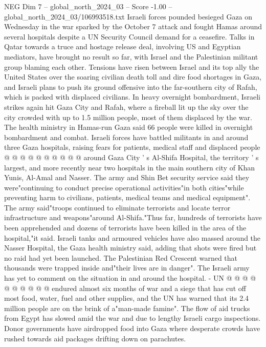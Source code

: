 \begin{textsample}{NEG Dim 7 – global\_north\_2024\_03 – Score -1.00 – global\_north\_2024\_03/106993518.txt}  \label{ex:f7_neg_418}
Israeli forces pounded besieged Gaza on Wednesday in the war sparked by the October 7 attack and fought Hamas around several hospitals despite a UN Security Council demand for a ceasefire.
Talks in Qatar towards a truce and hostage release deal, involving US and Egyptian mediators, have brought no result so far, with Israel and the Palestinian militant group blaming each other.
Tensions have risen between Israel and its top ally the United States over the soaring civilian death toll and dire food shortages in Gaza, and Israeli plans to push its ground offensive into the far-southern city of Rafah, which is packed with displaced civilians.
In heavy overnight bombardment, Israeli strikes again hit Gaza City and Rafah, where a fireball lit up the sky over the city crowded with up to 1.5 million people, most of them displaced by the war.
The health ministry in Hamas-run Gaza said 66 people were killed in overnight bombardment and combat.
Israeli forces have battled militants in and around three Gaza hospitals, raising fears for patients, medical staff and displaced people @ @ @ @ @ @ @ @ @ @ around Gaza City ' s Al-Shifa Hospital, the territory ' s largest, and more recently near two hospitals in the main southern city of Khan Yunis, Al-Amal and Nasser.
The army and Shin Bet security service said they were"continuing to conduct precise operational activities"in both cities"while preventing harm to civilians, patients, medical teams and medical equipment".
The army said"troops continued to eliminate terrorists and locate terror infrastructure and weapons"around Al-Shifa."Thus far, hundreds of terrorists have been apprehended and dozens of terrorists have been killed in the area of the hospital,"it said.
Israeli tanks and armoured vehicles have also massed around the Nasser Hospital, the Gaza health ministry said, adding that shots were fired but no raid had yet been launched.
The Palestinian Red Crescent warned that thousands were trapped inside and"their lives are in danger".
The Israeli army has yet to comment on the situation in and around the hospital. - UN @ @ @ @ @ @ @ @ @ @ endured almost six months of war and a siege that has cut off most food, water, fuel and other supplies, and the UN has warned that its 2.4 million people are on the brink of a"man-made famine".
The flow of aid trucks from Egypt has slowed amid the war and due to lengthy Israeli cargo inspections.
Donor governments have airdropped food into Gaza where desperate crowds have rushed towards aid packages drifting down on parachutes.

\end{textsample}
